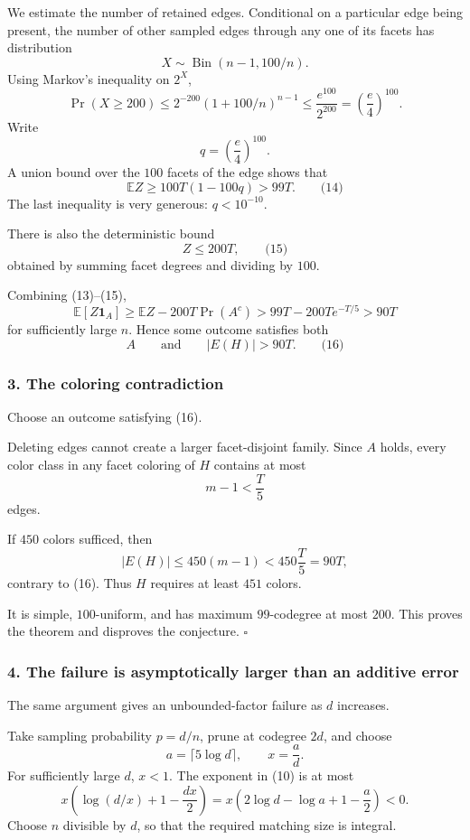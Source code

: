 \documentclass[
  11pt,
  a4paper,
]{article}
\begin{document}
We estimate the number of retained edges. Conditional on a particular
edge being present, the number of other sampled edges through any one of
its facets has distribution \[
X\sim\operatorname{Bin}(n-1,100/n).
\] Using Markov's inequality on \(2^X\), \[
\Pr(X\ge200)
\le
2^{-200}(1+100/n)^{n-1}
\le
\frac{e^{100}}{2^{200}}
=
\left(\frac e4\right)^{100}.
\] Write \[
q=\left(\frac e4\right)^{100}.
\] A union bound over the \(100\) facets of the edge shows that \[
\mathbb E Z
\ge
100T(1-100q)>99T. \qquad\text{(14)}
\] The last inequality is very generous: \(q<10^{-10}\).

There is also the deterministic bound \[
Z\le200T, \qquad\text{(15)}
\] obtained by summing facet degrees and dividing by \(100\).

Combining (13)--(15), \[
\mathbb E[Z\mathbf 1_A]
\ge
\mathbb E Z-200T\Pr(A^c)
>
99T-200T e^{-T/5}
>
90T
\] for sufficiently large \(n\). Hence some outcome satisfies both \[
A
\qquad\text{and}\qquad
|E(H)|>90T. \qquad\text{(16)}
\]

\subsubsection{3. The coloring
contradiction}\label{the-coloring-contradiction}

Choose an outcome satisfying (16).

Deleting edges cannot create a larger facet-disjoint family. Since \(A\)
holds, every color class in any facet coloring of \(H\) contains at most
\[
m-1<\frac T5
\] edges.

If \(450\) colors sufficed, then \[
|E(H)|
\le450(m-1)
<
450\frac T5
=
90T,
\] contrary to (16). Thus \(H\) requires at least \(451\) colors.

It is simple, \(100\)-uniform, and has maximum \(99\)-codegree at most
\(200\). This proves the theorem and disproves the conjecture.
\(\square\)

\subsubsection{4. The failure is asymptotically larger than an additive
error}\label{the-failure-is-asymptotically-larger-than-an-additive-error}

The same argument gives an unbounded-factor failure as \(d\) increases.

Take sampling probability \(p=d/n\), prune at codegree \(2d\), and
choose \[
a=\lceil5\log d\rceil,\qquad x=\frac ad.
\] For sufficiently large \(d\), \(x<1\). The exponent in (10) is at
most \[
x\left(\log(d/x)+1-\frac{dx}{2}\right)
=
x\left(2\log d-\log a+1-\frac a2\right)<0.
\] Choose \(n\) divisible by \(d\), so that the required matching size
is integral.
\end{document}
